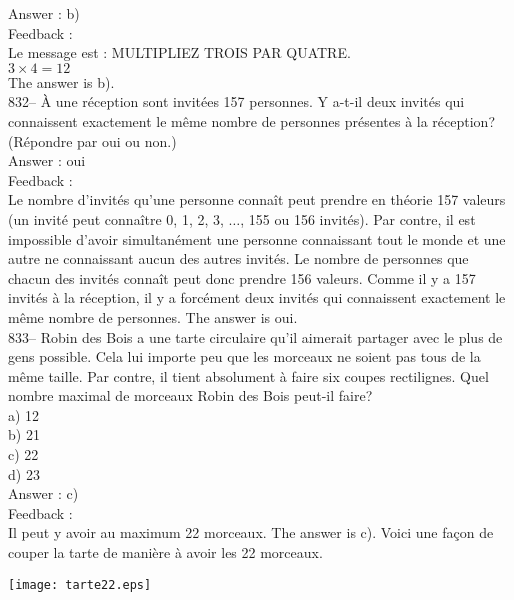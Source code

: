 ﻿\documentclass[letterpaper, 12pt]{article}
\begin{document}
Answer : b)\\

Feedback : \\
Le message est : \og MULTIPLIEZ TROIS PAR QUATRE\fg.\\
$3\times4=12$\\
The answer is b).\\


832-- \`A une r\'eception sont invit\'ees 157 personnes.  Y a-t-il deux
invit\'es qui connaissent exactement le m\^eme nombre de personnes
pr\'esentes \`a la r\'eception? (R\'epondre par oui ou non.)\\

Answer : oui\\

Feedback : \\
Le nombre d'invit\'es qu'une personne conna\^it peut prendre en th\'eorie
157 valeurs (un invit\'e peut conna\^itre 0, 1, 2, 3, $\ldots$, 155 ou 156
invit\'es).  Par contre, il est impossible d'avoir simultan\'ement une
personne connaissant tout le monde et une autre ne connaissant aucun des
autres invit\'es.  Le nombre de personnes que chacun des invit\'es conna\^it
peut donc prendre 156 valeurs.  Comme il y a 157 invit\'es \`a la
r\'eception, il y a forc\'ement deux invit\'es qui connaissent exactement le
m\^eme nombre de personnes.  The answer is oui.\\

833-- Robin des Bois a une tarte circulaire qu'il aimerait partager avec le
plus de gens possible.  Cela lui importe peu que les morceaux ne soient pas
tous de la m\^eme taille.  Par contre, il tient absolument \`a faire six
coupes rectilignes.  Quel nombre maximal de morceaux Robin des Bois peut-il
faire?\\
a) 12\\
b) 21\\
c) 22\\
d) 23\\

Answer : c)\\

Feedback : \\
Il peut y avoir au maximum 22 morceaux.  The answer is c).  Voici une
fa\c con de couper la tarte de mani\`ere \`a avoir les 22 morceaux.\\
    \begin{center}
    \texttt{[image: tarte22.eps]}
    \end{center}
\end{document}
